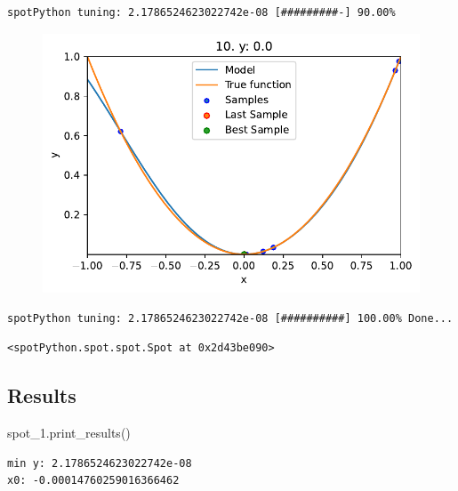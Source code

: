 \documentclass[
  letterpaper,
  DIV=11,
  numbers=noendperiod]{scrreprt}
\newenvironment{Shaded}{\begin{snugshade}}{\end{snugshade}}
\newcommand{\NormalTok}[1]{\textcolor[rgb]{0.00,0.23,0.31}{#1}}
\begin{document}
\begin{verbatim}
spotPython tuning: 2.1786524623022742e-08 [#########-] 90.00% 
\end{verbatim}

\begin{figure}[H]

{\centering \includegraphics{010_num_spot_sklearn_surrogate_files/figure-pdf/cell-21-output-14.pdf}

}

\end{figure}

\begin{verbatim}
spotPython tuning: 2.1786524623022742e-08 [##########] 100.00% Done...
\end{verbatim}

\begin{verbatim}
<spotPython.spot.spot.Spot at 0x2d43be090>
\end{verbatim}

\hypertarget{results-2}{%
\subsection{Results}\label{results-2}}

\begin{Shaded}
\begin{Highlighting}[]
\NormalTok{spot\_1.print\_results()}
\end{Highlighting}
\end{Shaded}

\begin{verbatim}
min y: 2.1786524623022742e-08
x0: -0.00014760259016366462
\end{verbatim}
\end{document}
